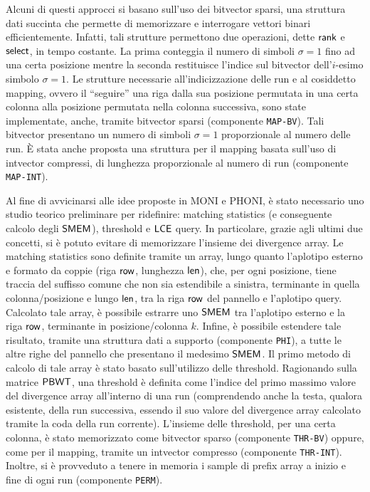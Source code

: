 \documentclass[a4paper,11pt, oneside,italian]{article}
\def\rank{\mbox{\rm {\sf rank}}}
\def\LCE{\mbox{\rm {\sf LCE}}}
\def\select{\mbox{\rm {\sf select}}}
\def\len{\mbox{\rm {\sf len}}}
\def\row{\mbox{\rm {\sf row}}}
\def\PBWT{\mbox{\rm {\sf PBWT}}}
\def\SMEM{\mbox{\rm {\sf SMEM}}}
\def\LCE{\mbox{\rm {\sf LCE}}}
\begin{document}
Alcuni di questi approcci si basano sull'uso dei bitvector 
sparsi, una struttura dati succinta che permette di memorizzare e interrogare
vettori binari efficientemente. Infatti, tali strutture permettono due
operazioni, dette $\rank$ e $\select$, in tempo costante. La prima conteggia il 
numero di simboli $\sigma=1$ fino ad una certa posizione mentre la seconda
restituisce l'indice sul bitvector dell'$i$-esimo simbolo $\sigma=1$. 
Le strutture necessarie all'indicizzazione delle run e al cosiddetto
mapping, ovvero il ``seguire'' una riga dalla sua posizione permutata in una
certa colonna alla posizione permutata nella colonna successiva,
sono state implementate, anche, tramite bitvector sparsi (componente
\texttt{MAP-BV}). Tali bitvector presentano un numero di simboli 
$\sigma=1$ proporzionale al numero delle run. È stata anche proposta una
struttura per il mapping basata sull'uso di intvector compressi, di lunghezza
proporzionale al numero di run (componente 
\texttt{MAP-INT}).  

Al fine di avvicinarsi alle idee proposte in MONI e PHONI, è
stato necessario uno studio teorico preliminare per ridefinire: matching
statistics (e conseguente calcolo degli $\SMEM$), threshold e $\LCE$ query. In
particolare, grazie agli  
ultimi due concetti, si è potuto evitare di memorizzare l'insieme dei divergence
array. 
Le matching statistics sono definite tramite un array,
lungo quanto l'aplotipo esterno e formato da coppie (riga $\row$, lunghezza
$\len$), 
che, per ogni posizione, tiene traccia del suffisso comune che non sia
estendibile 
a sinistra, terminante in quella colonna/posizione e lungo $\len$, tra la riga
$\row$ del 
pannello e l'aplotipo query. Calcolato tale
array, è possibile estrarre uno $\SMEM$ tra l'aplotipo esterno e
la riga $\row$, terminante in posizione/colonna $k$. Infine, è possibile
estendere tale 
risultato, tramite una struttura dati a 
supporto (componente \texttt{PHI}),  
a tutte le altre righe del pannello che presentano il medesimo $\SMEM$.
Il primo metodo di calcolo di tale array è stato basato sull'utilizzo delle
threshold. Ragionando sulla matrice $\PBWT$, una threshold è definita
come l'indice del primo massimo valore del divergence array all'interno di una
run (comprendendo anche la testa, qualora esistente, della run successiva,
essendo 
il suo valore del divergence array calcolato tramite la coda della run
corrente). L'insieme delle threshold, per una certa colonna, è stato memorizzato
come bitvector sparso (componente \texttt{THR-BV}) oppure, come per il mapping,
tramite un intvector compresso (componente \texttt{THR-INT}). Inoltre, si è
provveduto a tenere in memoria i  
sample di prefix array a inizio e fine di ogni run (componente \texttt{PERM}). 
\end{document}
